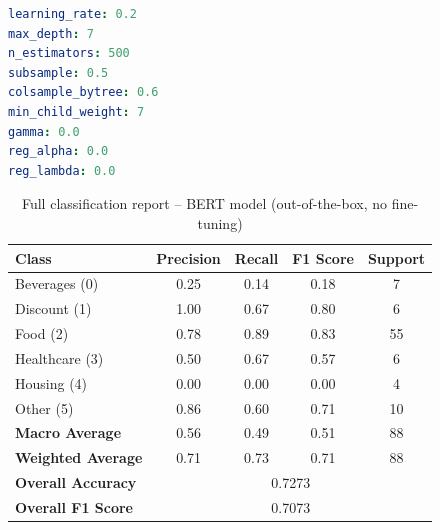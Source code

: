 \documentclass{SGGW-thesis-EN}
\begin{document}
\begin{lstlisting}[language=yaml, caption={XGBoost hyperparameters – Sentence-Transformer (GPT + real fine-tuned)}, label={lst:gpt_real_params}]
learning_rate: 0.2
max_depth: 7
n_estimators: 500
subsample: 0.5
colsample_bytree: 0.6
min_child_weight: 7
gamma: 0.0
reg_alpha: 0.0
reg_lambda: 0.0
\end{lstlisting}

\begin{table}[h!]
  \centering
  \caption{Full classification report – BERT model (out-of-the-box, no fine-tuning)}
  \label{appendix:bert-report-outofbox}
  \begin{tabularx}{\textwidth}{lcccc}
    \toprule
    \textbf{Class} & \textbf{Precision} & \textbf{Recall} & \textbf{F1 Score} & \textbf{Support} \\
    \midrule
    Beverages (0)     & 0.25 & 0.14 & 0.18 & 7 \\
    Discount (1)      & 1.00 & 0.67 & 0.80 & 6 \\
    Food (2)          & 0.78 & 0.89 & 0.83 & 55 \\
    Healthcare (3)    & 0.50 & 0.67 & 0.57 & 6 \\
    Housing (4)       & 0.00 & 0.00 & 0.00 & 4 \\
    Other (5)         & 0.86 & 0.60 & 0.71 & 10 \\
    \midrule
    \textbf{Macro Average}   & 0.56 & 0.49 & 0.51 & 88 \\
    \textbf{Weighted Average}& 0.71 & 0.73 & 0.71 & 88 \\
    \textbf{Overall Accuracy}& \multicolumn{4}{c}{0.7273} \\
    \textbf{Overall F1 Score}& \multicolumn{4}{c}{0.7073} \\
    \bottomrule
  \end{tabularx}
\end{table}
\renewcommand{\bibname}{Bibliography}

\printbibliography

\beforelastpage
\end{document}
